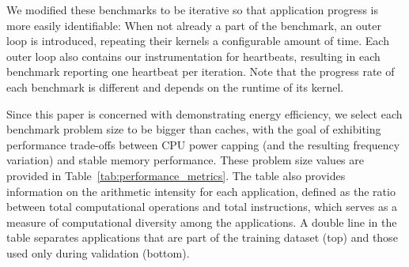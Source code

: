 We modified these benchmarks to be iterative so that application progress is more easily identifiable: When not already a part of the benchmark, an outer loop is introduced, repeating their kernels a configurable amount of time. Each outer loop also contains our instrumentation for heartbeats, resulting in each  benchmark reporting one heartbeat per iteration. Note that the progress rate of each benchmark is different and depends on the runtime of its kernel.

Since this paper is concerned with demonstrating energy efficiency, we select each benchmark problem size to be bigger than caches, with the goal of exhibiting performance trade-offs between CPU power capping (and the resulting frequency variation) and stable memory performance.
These problem size values are provided in Table~\ref{tab:performance_metrics}. The table also provides information on the arithmetic intensity for each application, defined as the ratio between total computational operations  and total instructions, which serves as a measure of computational diversity among the applications. A double line  in the table separates applications that are part of the training dataset (top) and those used only during validation (bottom).

